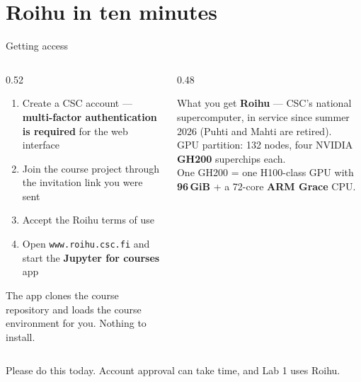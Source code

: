 \documentclass[aspectratio=169,10pt]{beamer}
\begin{document}
\section{Roihu in ten minutes}

\begin{frame}{Getting access}
  \begin{columns}[T]
    \begin{column}{0.52\textwidth}
      \begin{enumerate}
        \item Create a CSC account --- \textbf{multi-factor authentication is
          required} for the web interface
        \item Join the course project through the invitation link you were sent
        \item Accept the Roihu terms of use
        \item Open \texttt{www.roihu.csc.fi} and start the
          \textbf{Jupyter for courses} app
      \end{enumerate}
      \vspace{0.5em}
      The app clones the course repository and loads the course environment for
      you. Nothing to install.
    \end{column}
    \begin{column}{0.48\textwidth}
      \begin{block}{What you get}
        \small
        \textbf{Roihu} --- CSC's national supercomputer, in service since
        summer 2026 (Puhti and Mahti are retired).\\[0.4em]
        GPU partition: 132 nodes, four NVIDIA \textbf{GH200} superchips each.\\[0.4em]
        One GH200 = one H100-class GPU with \textbf{96\,GiB} + a 72-core
        \textbf{ARM Grace} CPU.
      \end{block}
    \end{column}
  \end{columns}
  \vspace{0.4em}
  \alert{Please do this today.} Account approval can take time, and Lab 1 uses
  Roihu.
\end{frame}
\end{document}
